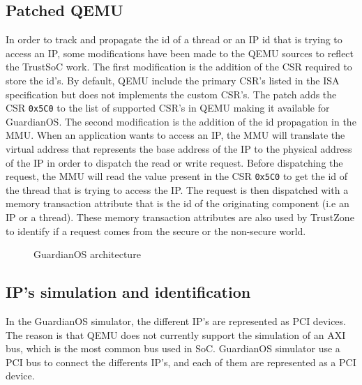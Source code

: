 \documentclass[conference]{IEEEtran}
\begin{document}
\subsection{Patched QEMU}\label{BC}
In order to track and propagate the id of a thread or an IP id that is trying to access an IP, some modifications have been made to the QEMU sources to reflect the TrustSoC work. The first modification is the addition of the CSR required to store the id's. By default, QEMU include the primary CSR's listed in the ISA specification \cite{k_risc-v_2023} but does not implements the custom CSR's. The patch adds the CSR \texttt{0x5C0} to the list of supported CSR's in QEMU making it available for GuardianOS. The second modification is the addition of the id propagation in the MMU. When an application wants to access an IP, the MMU will translate the virtual address that represents the base address of the IP to the physical address of the IP in order to dispatch the read or write request. Before dispatching the request, the MMU will read the value present in the CSR \texttt{0x5C0} to get the id of the thread that is trying to access the IP. The request is then dispatched with a memory transaction attribute that is the id of the originating component (i.e an IP or a thread). These memory transaction attributes are also used by TrustZone to identify if a request comes from the secure or the non-secure world. 

\begin{figure*}[t]
    \centering
     
    \caption{GuardianOS architecture}
    \label{fig:architecture}
\end{figure*}

\subsection{IP's simulation and identification}\label{BD}
In the GuardianOS simulator, the different IP's are represented as PCI devices. The reason is that QEMU does not currently support the simulation of an AXI bus, which is the most common bus used in SoC. GuardianOS simulator use a PCI bus to connect the differents IP's, and each of them are represented as a PCI device. 
\end{document}
